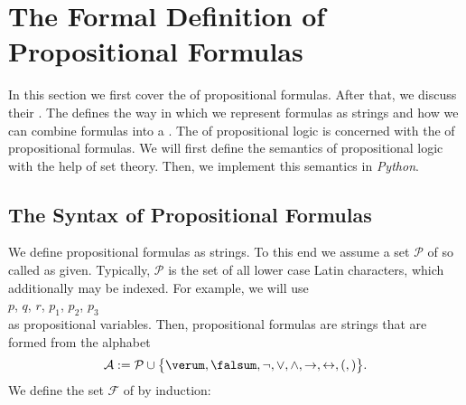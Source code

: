 \section{The Formal Definition of Propositional Formulas}
In this section we first cover the  of propositional formulas.  After that, we discuss their
. The   defines the way in which we represent formulas as strings
and how we can combine formulas into a .  The   of propositional
logic is concerned with the   of propositional formulas.
We will first define the semantics of propositional logic with the help of set theory.
Then, we implement this semantics in \textsl{Python}.

\subsection{The Syntax of Propositional Formulas}
We define propositional formulas as strings.  To this end we assume a set  $\mathcal{P}$  
of so called  as given. 
Typically, $\mathcal{P}$ is the set of all lower case Latin characters, which additionally may be indexed.
For example, we will use 
\\[0.2cm]
\hspace*{1.3cm}
$p$, $q$, $r$, $p_1$, $p_2$, $p_3$
\\[0.2cm]
as propositional variables.  Then, propositional formulas are strings that are formed from the alphabet
$$ 
  \mathcal{A} := \mathcal{P} \cup \bigl\{ \verum, \falsum, \neg, \vee, \wedge,
   \rightarrow, \leftrightarrow, (, ) \bigr\}.
$$
We define the set $\mathcal{F}$ of 
by induction:
